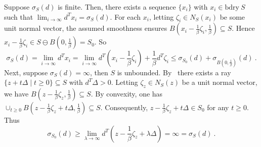 \documentclass[sn-mathphys,Numbered]{sn-jnl}%
\newcommand{\bdry}{\mathrm{bdry\ }}
\begin{document}
\begin{appendices}
{Suppose $\sigma_S(d)$ is finite. Then, there exists a sequence $\{x_i\}$ with $x_i \in \bdry S$ such that $\lim_{i \rightarrow \infty} d^Tx_i =\sigma_S(d)$. For each $x_i$, letting $\zeta_i \in N_S(x_i)$ be some unit normal vector, the assumed smoothness ensures $B(x_i-\frac{1}{\beta}\zeta_i, \frac{1}{\beta}) \subseteq S$. Hence $x_i-\frac{1}{\beta}\zeta_i \in S\ominus B(0,\frac{1}{\beta})=S_0$. So
$$ \sigma_S(d) = \lim_{i \rightarrow \infty} d^Tx_i = \lim_{i \rightarrow \infty} d^T(x_i-\frac{1}{\beta}\zeta_i)+\frac{1}{\beta}d^T\zeta_i \leq \sigma_{S_0}(d)+\sigma_{B(0,\frac{1}{\beta})}(d)\ .
$$
Next, suppose $\sigma_S(d)=\infty$, then $S$ is unbounded. By~\cite[Proposition 1.4.2(a)]{bertsekas2009convex} there exists a ray $\{ z + t \Delta \mid t \geq 0\}\subseteq S$ with $d^T\Delta >0$. Letting $\zeta_z \in N_S(z)$ be a unit normal vector, we have $B(z-\frac{1}{\beta}\zeta_z, \frac{1}{\beta}) \subseteq S$. By convexity, one has $\cup_{t\geq 0} B(z-\frac{1}{\beta}\zeta_z+t\Delta, \frac{1}{\beta}) \subseteq S$. Consequently, $z-\frac{1}{\beta}\zeta_z+ t\Delta \in S_0$ for any $t\geq 0$. Thus
$$ \sigma_{S_0}(d) \geq \lim_{\lambda \rightarrow \infty} d^T(z-\frac{1}{\beta}\zeta_z+\lambda \Delta) =\infty = \sigma_S(d)\ .
$$



}
\end{appendices}
\end{document}
